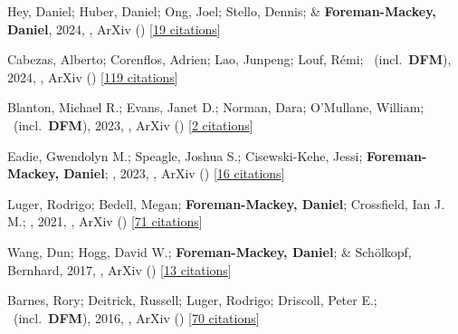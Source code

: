 \item[{\color{numcolor}\scriptsize9}] Hey, Daniel; Huber, Daniel; Ong, Joel; Stello, Dennis; \& \textbf{Foreman-Mackey, Daniel}, 2024, , ArXiv () [\href{https://ui.adsabs.harvard.edu/abs/2024arXiv240302489H}{19 citations}]

\item[{\color{numcolor}\scriptsize8}] Cabezas, Alberto; Corenflos, Adrien; Lao, Junpeng; Louf, R{\'e}mi; \etal\ (incl.\ \textbf{DFM}), 2024, , ArXiv () [\href{https://ui.adsabs.harvard.edu/abs/2024arXiv240210797C}{119 citations}]

\item[{\color{numcolor}\scriptsize7}] Blanton, Michael R.; Evans, Janet D.; Norman, Dara; O'Mullane, William; \etal\ (incl.\ \textbf{DFM}), 2023, , ArXiv () [\href{https://ui.adsabs.harvard.edu/abs/2023arXiv231104272B}{2 citations}]

\item[{\color{numcolor}\scriptsize6}] Eadie, Gwendolyn M.; Speagle, Joshua S.; Cisewski-Kehe, Jessi; \textbf{Foreman-Mackey, Daniel}; \etal, 2023, , ArXiv () [\href{https://ui.adsabs.harvard.edu/abs/2023arXiv230204703E}{16 citations}]

\item[{\color{numcolor}\scriptsize5}] Luger, Rodrigo; Bedell, Megan; \textbf{Foreman-Mackey, Daniel}; Crossfield, Ian J. M.; \etal, 2021, , ArXiv () [\href{https://ui.adsabs.harvard.edu/abs/2021arXiv211006271L}{71 citations}]

\item[{\color{numcolor}\scriptsize4}] Wang, Dun; Hogg, David W.; \textbf{Foreman-Mackey, Daniel}; \& Sch{\"o}lkopf, Bernhard, 2017, , ArXiv () [\href{https://ui.adsabs.harvard.edu/abs/2017arXiv171002428W}{13 citations}]

\item[{\color{numcolor}\scriptsize3}] Barnes, Rory; Deitrick, Russell; Luger, Rodrigo; Driscoll, Peter E.; \etal\ (incl.\ \textbf{DFM}), 2016, , ArXiv () [\href{https://ui.adsabs.harvard.edu/abs/2016arXiv160806919B}{70 citations}]

